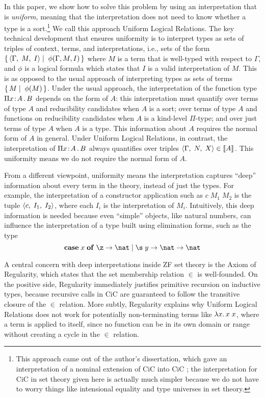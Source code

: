 \documentclass{article}
\begin{document}
In this paper, we show how to solve this problem by using an
interpretation that is \emph{uniform}, meaning that the interpretation
does not need to know whether a type is a sort.\footnote{This approach
  came out of the author's dissertation, which gave an interpretation
  of a nominal extension of CiC into CiC \cite{westbrook-thesis}; the
  interpretation for CiC in set theory given here is actually much
  simpler because we do not have to worry things like intensional
  equality and type universes in set theory.}  We call this approach
Uniform Logical Relations.  The key technical development that ensures
uniformity is to interpret types as sets of triples of context, terms, and
interpretations, i.e., sets of the form
$\{\, \langle \Gamma ,\; M, \; I\rangle \;|\;\; \phi(\Gamma,M,I) \,\}$ where $M$ is a term
that is well-typed with respect to $\Gamma$,
and $\phi$ is
a logical formula which states that $I$ is a valid interpretation of
$M$. This is as opposed to the usual approach of interpreting types as
sets of terms $\{\, M \;|\;\; \phi(M) \,\}$.
Under
the usual approach, the interpretation of the function type
$\Pi x\!:\!A\,.\,B$ depends on the form of $A$: this interpretation
must quantify over terms of type $A$ and
reducibility candidates when $A$ is a sort; over terms of type $A$ and
functions on reducibility candidates when $A$ is a kind-level
$\Pi$-type; and over just terms of type $A$ when $A$ is a type.  This
information about $A$ requires the normal form of $A$ in general.
Under Uniform Logical Relations, in contrast, the interpretation of
$\Pi x\!:\!A\,.\,B$ always quantifies over triples
$\langle \Gamma ,\; N, \; X\rangle\in\llbracket A \rrbracket^{}$. This uniformity means we do not require
the normal form of $A$.


From a different viewpoint, uniformity means the interpretation
captures ``deep'' information about every term in the theory, instead
of just the types. For example, the interpretation of a constructor
application such as $c\;M_1\;M_2$ is the tuple $\langle c ,\; I_1, \; I_2\rangle$,
where each $I_i$ is the interpretation of $M_i$. Intuitively, this
deep information is needed because even ``simple'' objects, like
natural numbers, can influence the interpretation of a type built
using elimination forms, such as the type
\[
\caseof{x}{\pcnoctxt{\z}{\nat} \;|\; \pcnoctxt{\s\;y}{\nat\to\nat}}
\]

A central concern with deep interpretations inside ZF set theory is
the Axiom of Regularity, which states that the set membership relation
$\in$ is well-founded. On the positive side, Regularity immediately
justifies primitive recursion on inductive types, because recursive
calls in CiC are guaranteed to follow the transitive closure of the
$\in$ relation.  More subtly, Regularity explains why Uniform Logical
Relations does not work for potentially non-terminating terms like
$\lambda x.\,x\;x$, where a term is applied to itself, since no
function can be in its own domain or range without creating a cycle in
the $\in$ relation.
\end{document}
